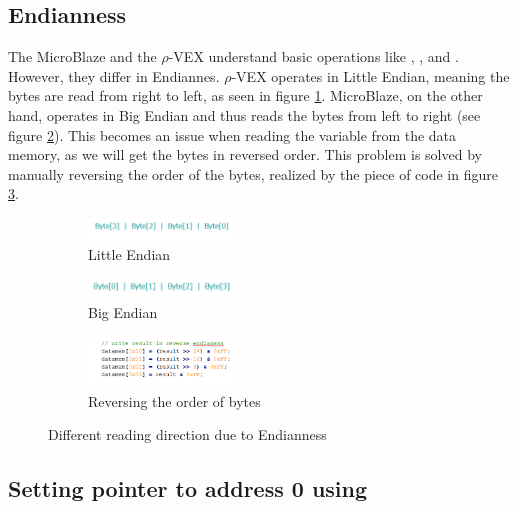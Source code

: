 \subsection{Endianness}
The MicroBlaze and the $\rho$-VEX understand basic operations like , ,  and . However, they differ in Endiannes. $\rho$-VEX operates in Little Endian, meaning the bytes are read from right to left, as seen in figure \ref{fig:little}. MicroBlaze, on the other hand, operates in Big Endian and thus reads the bytes from left to right (see figure \ref{fig:big}). This becomes an issue when reading the  variable from the data memory, as we will get the bytes in reversed order. This problem is solved by manually reversing the order of the  bytes, realized by the piece of code in figure \ref{fig:swap}.

\begin{figure}[htb]
	\centering
	\begin{subfigure} [h] {0.5\textwidth}
		\centering
		\includegraphics[width=150px]{Pictures/little}
		\caption{Little Endian}
		\label{fig:little}
	\end{subfigure}
	\quad
	\begin{subfigure} [h] {0.5\textwidth}
		\centering
		\includegraphics[width=150px]{Pictures/big}
		\caption{Big Endian}
		\label{fig:big}
	\end{subfigure}
	\quad
	\begin{subfigure} [h] {0.5\textwidth}
		\centering
		\includegraphics[width=150px]{Pictures/byteswap}
		\caption{Reversing the order of bytes}
		\label{fig:swap}
	\end{subfigure}
\caption{Different reading direction due to Endianness}%
\label{}%
\end{figure}

\subsection{Setting pointer to address 0 using }

